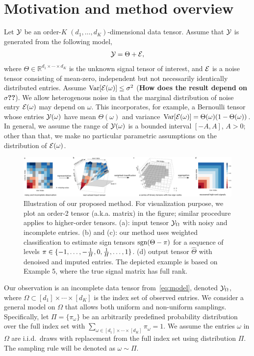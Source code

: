 \documentclass{article}
\theoremstyle{plain}
\theoremstyle{definition}
\def\sign{\textup{sgn}}
\begin{document}
\section{Motivation and method overview}

Let $\mathcal{Y}$ be an order-$K$ $(d_1,\ldots,d_K)$-dimensional data tensor. Assume that $\mathcal{Y}$ is generated from the following model,
\begin{equation}\label{eq:model}
\mathcal{Y}=\Theta+\mathcal{E},
\end{equation}
where $\Theta\in\mathbb{R}^{d_1\times \cdots \times d_K}$ is the unknown signal tensor of interest, and $\mathcal{E}$ is a noise tensor consisting of mean-zero, independent but not necessarily identically distributed entries. Assume $\text{Var}[\mathcal{E}(\omega)]\leq \sigma^2$ ({\bf How does the result depend on $\sigma$??}). We allow heterogenous noise in that the marginal distribution of noise entry $\mathcal{E}(\omega)$ may depend on $\omega$. This incorporates, for example, a Bernoulli tensor whose entries $\mathcal{Y}(\omega)$ have mean $\Theta(\omega)$ and variance $\text{Var}[\mathcal{E}(\omega)]=\Theta(\omega)(1-\Theta(\omega))$. In general, we assume the range of $\mathcal{Y}(\omega)$ is a bounded interval $[-A, A]$, $A>0$; other than that, we make no particular parametric assumptions on the distribution of $\mathcal{E}(\omega)$.

\begin{figure}[h!]
\centerline{\includegraphics[width=1\textwidth]{figure/image_new2.pdf}}
\caption{Illustration of our proposed method. For visualization purpose, we plot an order-2 tensor (a.k.a. matrix) in the figure; similar procedure applies to higher-order tensors. (a): input tensor $\mathcal{Y}_\Omega$ with noisy and incomplete entries. (b) and (c): our method uses weighted classification to estimate sign tensors $\sign(\Theta-\pi)$ for a sequence of levels $\pi\in \{-1,\ldots,-{1\over H},0,{1\over H},\ldots,1\}$. (d) output tensor $\hat \Theta$ with denoised and imputed entries. The depicted example is based on Example 5, where the true signal matrix has full rank. }\label{fig:demo}
\end{figure}

Our observation is an incomplete data tensor from~\eqref{eq:model}, denoted $\mathcal{Y}_\Omega$, where $\Omega\subset[d_1]\times\cdots\times[d_K]$ is the index set of observed entries. We consider a general model on $\Omega$ that allows both uniform and non-uniform samplings. Specifically, let $\Pi=\{\pi_\omega\}$ be an arbitrarily predefined probability distribution over the full index set with $\sum_{\omega\in[d_1]\times \cdots \times [d_K]}\pi_\omega=1$. We assume the entries $\omega$ in $\Omega$ are i.i.d.\ draws with replacement from the full index set using distribution $\Pi$. The sampling rule will be denoted as $\omega\sim \Pi$.
\end{document}
